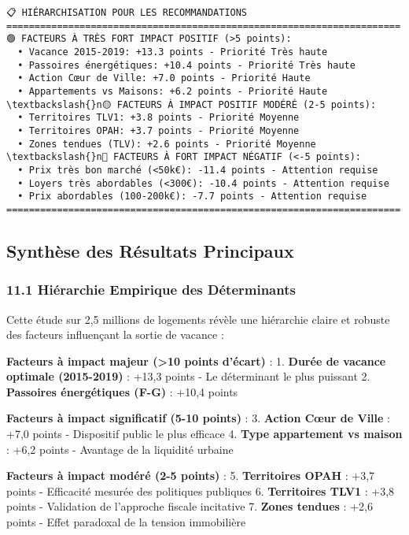 \documentclass[11pt]{article}
\begin{document}
    \begin{Verbatim}[commandchars=\\\{\}]
📋 HIÉRARCHISATION POUR LES RECOMMANDATIONS
======================================================================
🟢 FACTEURS À TRÈS FORT IMPACT POSITIF (>5 points):
  • Vacance 2015-2019: +13.3 points - Priorité Très haute
  • Passoires énergétiques: +10.4 points - Priorité Très haute
  • Action Cœur de Ville: +7.0 points - Priorité Haute
  • Appartements vs Maisons: +6.2 points - Priorité Haute
\textbackslash{}n🟡 FACTEURS À IMPACT POSITIF MODÉRÉ (2-5 points):
  • Territoires TLV1: +3.8 points - Priorité Moyenne
  • Territoires OPAH: +3.7 points - Priorité Moyenne
  • Zones tendues (TLV): +2.6 points - Priorité Moyenne
\textbackslash{}n🔴 FACTEURS À FORT IMPACT NÉGATIF (<-5 points):
  • Prix très bon marché (<50k€): -11.4 points - Attention requise
  • Loyers très abordables (<300€): -10.4 points - Attention requise
  • Prix abordables (100-200k€): -7.7 points - Attention requise
======================================================================
    \end{Verbatim}

    \subsection{Synthèse des Résultats
Principaux}\label{synthuxe8se-des-ruxe9sultats-principaux}

\subsubsection{11.1 Hiérarchie Empirique des
Déterminants}\label{hiuxe9rarchie-empirique-des-duxe9terminants}

Cette étude sur 2,5 millions de logements révèle une hiérarchie claire
et robuste des facteurs influençant la sortie de vacance :

\textbf{Facteurs à impact majeur (\textgreater10 points d'écart)} : 1.
\textbf{Durée de vacance optimale (2015-2019)} : +13,3 points - Le
déterminant le plus puissant 2. \textbf{Passoires énergétiques (F-G)} :
+10,4 points

\textbf{Facteurs à impact significatif (5-10 points)} : 3.
\textbf{Action Cœur de Ville} : +7,0 points - Dispositif public le plus
efficace 4. \textbf{Type appartement vs maison} : +6,2 points - Avantage
de la liquidité urbaine

\textbf{Facteurs à impact modéré (2-5 points)} : 5. \textbf{Territoires
OPAH} : +3,7 points - Efficacité mesurée des politiques publiques 6.
\textbf{Territoires TLV1} : +3,8 points - Validation de l'approche
fiscale incitative 7. \textbf{Zones tendues} : +2,6 points - Effet
paradoxal de la tension immobilière
\end{document}

